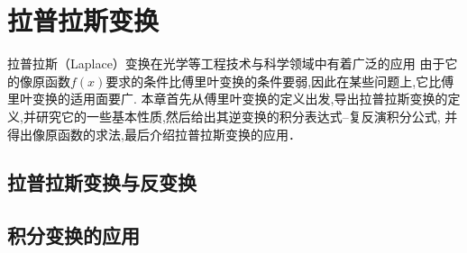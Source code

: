\chapter{拉普拉斯变换}
拉普拉斯（Laplace）变换在光学等工程技术与科学领域中有着广泛的应用
% 
由于它的像原函数$f(x)$要求的条件比傅里叶变换的条件要弱,因此在某些问题上,它比傅里叶变换的适用面要广.
本章首先从傅里叶变换的定义出发,导出拉普拉斯变换的定义,并研究它的一些基本性质,然后给出其逆变换的积分表达式--复反演积分公式,
并得出像原函数的求法,最后介绍拉普拉斯变换的应用．
\section{拉普拉斯变换与反变换}
\label{sec:laplace_transform_and_inverse_transform}



\section{积分变换的应用}
\label{sec:integral_transform_applications}
